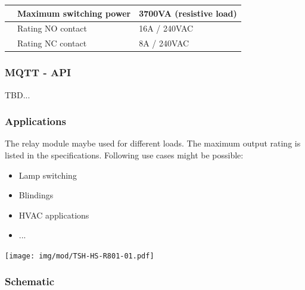 \documentclass[]{scrreprt}%
\begin{document}
\begin{table}[h!]
\begin{tabular}{|l|l|l|}
                                                                                                 & Maximum switching power    & 3700VA (resistive load)                                                                                                                                                                     \\ \hline
                                                                                                 & Rating NO contact          & 16A / 240VAC                                                                                                                                                                                \\ \hline
                                                                                                 & Rating NC contact          & 8A / 240VAC                                                                                                                                                                                 \\ \hline
\end{tabular}
\end{table}

\subsubsection{MQTT - API}

TBD...
\newpage

\subsubsection{Applications}

The relay module maybe used for different loads. The maximum output rating is listed in the specifications.
Following use cases might be possible:

\begin{itemize}
 \item Lamp switching
 \item Blindings
 \item HVAC applications
 \item ...
\end{itemize}

\begin{center}
\texttt{[image: img/mod/TSH-HS-R801-01.pdf]} 
\end{center}




\subsubsection{Schematic}
  
\end{document}
